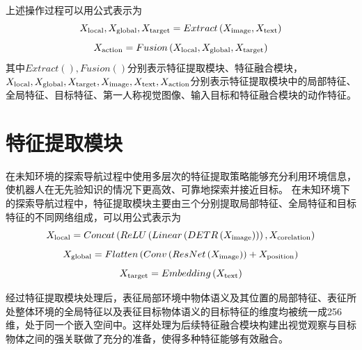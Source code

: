 上述操作过程可以用公式表示为
\begin{equation}
    {X_{{\rm{local}}}},{X_{{\rm{global}}}},{X_{{\rm{target}}}} = Extract\left( {{X_{{\rm{image}}}},{X_{{\rm{text}}}}} \right)
    \label{myeq30}
\end{equation}
\begin{equation}
    {X_{{\rm{action}}}} = Fusion\left( {{X_{{\rm{local}}}},{X_{{\rm{global}}}},{X_{{\rm{target}}}}} \right)
    \label{myeq31}
\end{equation}
其中$Extract\left( {} \right),Fusion\left( {} \right)$分别表示特征提取模块、特征融合模块，${X_{{\rm{local}}}},{X_{{\rm{global}}}},{X_{{\rm{target}}}},{X_{{\rm{image}}}},{X_{{\rm{text}}}},{X_{{\rm{action}}}}$分别表示特征提取模块中的局部特征、全局特征、目标特征、第一人称视觉图像、输入目标和特征融合模块的动作特征。



\section{特征提取模块}
在未知环境的探索导航过程中使用多层次的特征提取策略能够充分利用环境信息，使机器人在无先验知识的情况下更高效、可靠地探索并接近目标。
在未知环境下的探索导航过程中，特征提取模块主要由三个分别提取局部特征、全局特征和目标特征的不同网络组成，可以用公式表示为
\begin{equation}
{X_{{\rm{local}}}} = Concat\left( {ReLU\left( {Linear\left( {DETR\left( {{X_{{\rm{image}}}}} \right)} \right)} \right),{X_{{\rm{corelation}}}}} \right)
    \label{myeq32}
\end{equation}
\begin{equation}
{X_{{\rm{global}}}} = Flatten\left( {Conv\left( {ResNet\left( {{X_{{\rm{image}}}}} \right)} \right) + {X_{{\rm{position}}}}} \right)
    \label{myeq33}
\end{equation}
\begin{equation}
{X_{{\rm{target}}}} = Embedding\left( {{X_{{\rm{text}}}}} \right)
    \label{myeq34}
\end{equation}

经过特征提取模块处理后，表征局部环境中物体语义及其位置的局部特征、表征所处整体环境的全局特征以及表征目标物体语义的目标特征的维度均被统一成256维，处于同一个嵌入空间中。这样处理为后续特征融合模块构建出视觉观察与目标物体之间的强关联做了充分的准备，使得多种特征能够有效融合。

